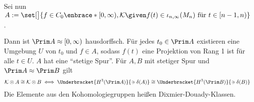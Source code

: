 \begin{beispiel}[label=bsp:84,{name=[Dixmier-Duady-Klassen]}]
	Sei nun $A := \set[\big]{f \in C_0\enbrace*{[0,\infty),\mathcal{K}} \given f(t) \in \iota_{n,\infty}(M_n) \text{ für }t \in [n-1,n)}$.
	\begin{figure}[ht]
	\end{figure}
	Dann ist $\Prim A \approx [0,\infty)$ hausdorffsch.
	Für jedes $t_0 \in \Prim A$ existieren eine Umgebung $U$ von $t_0$ und $f \in A$, sodass $f(t)$ eine Projektion von Rang 1 ist für alle $t \in U$.
	$A$ hat eine \enquote{stetige Spur}.
	Für $A,B$ mit stetiger Spur und $\Prim A \approx \Prim B$ gilt 
	\[
		\mathcal{K} \otimes A \cong \mathcal{K} \otimes B \iff \Underbracket{H^3(\Prim A)}{\ni \delta(A)}\cong \Underbracket{H^3(\Prim B)}{\ni\delta(B)} 
	\]
	Die Elemente aus den Kohomologiegruppen heißen Dixmier-Douady-Klassen.
\end{beispiel}

